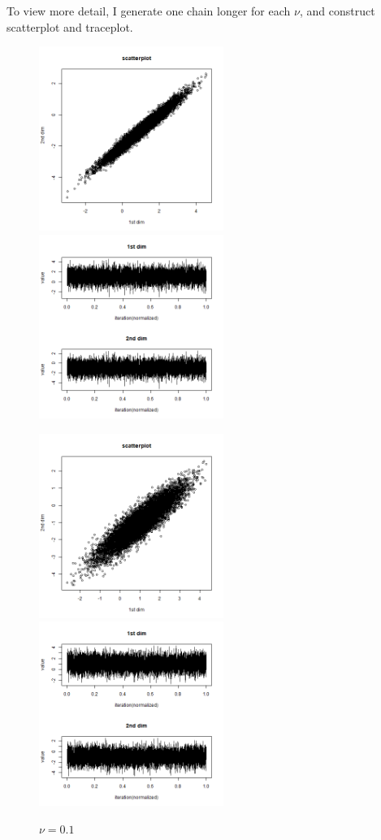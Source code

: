 \documentclass{article}
\begin{document}
\clearpage
To view more detail, I generate one chain longer for each $\nu$, and construct scatterplot and traceplot.
\begin{figure}[!h]
    \centering
    \includegraphics[height=6cm]{prob1_test3_oneprocess_scatter.png}
    \includegraphics[height=6cm]{prob1_test3_oneprocess_traceplot.png}
    \caption{$\nu=0.1$}
    \centering
    \includegraphics[height=6cm]{prob1_test2_oneprocess_scatter.png}
    \includegraphics[height=6cm]{prob1_test2_oneprocess_traceplot.png}

\end{figure}
\end{document}
